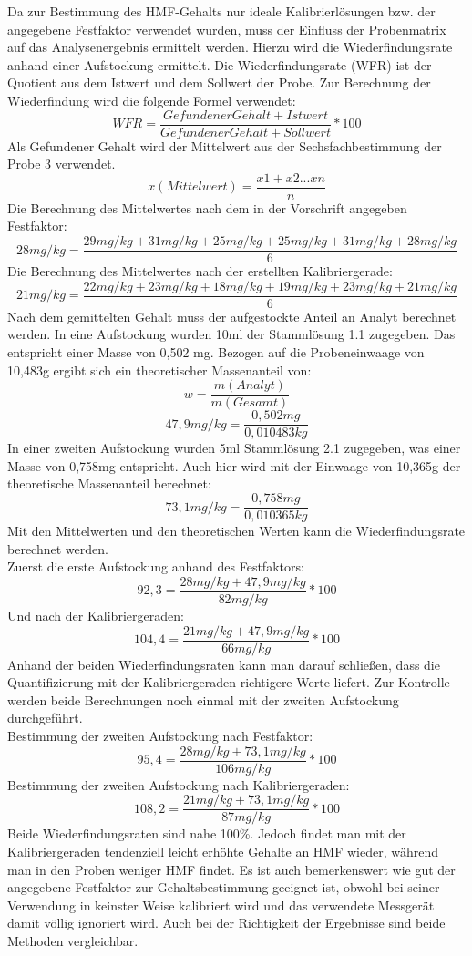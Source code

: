 Da zur Bestimmung des HMF-Gehalts nur ideale Kalibrierlösungen bzw. der angegebene Festfaktor verwendet wurden, muss der Einfluss der Probenmatrix auf das Analysenergebnis ermittelt werden. Hierzu wird die Wiederfindungsrate anhand einer Aufstockung ermittelt. Die Wiederfindungsrate (WFR) ist der Quotient aus dem Istwert und dem Sollwert der Probe. Zur Berechnung der Wiederfindung wird die folgende Formel verwendet:
    \[WFR=\frac{ Gefundener Gehalt + Istwert }{ Gefundener Gehalt + Sollwert } *100 \]
Als Gefundener Gehalt wird der Mittelwert aus der Sechsfachbestimmung der Probe 3 verwendet.
    \[x(Mittelwert)=\frac{ x1+x2...xn }{ n } \]
Die Berechnung des Mittelwertes nach dem in der Vorschrift angegeben Festfaktor:
    \[28mg/kg=\frac{ 29mg/kg+31mg/kg+25mg/kg+25mg/kg+31mg/kg+28mg/kg }{ 6 } \]
Die Berechnung des Mittelwertes nach der erstellten Kalibriergerade:
    \[21mg/kg=\frac{ 22mg/kg+23mg/kg+18mg/kg+19mg/kg+23mg/kg+21mg/kg }{ 6 } \]
Nach dem gemittelten Gehalt muss der aufgestockte Anteil an Analyt berechnet werden. In eine Aufstockung wurden 10ml der Stammlösung 1.1 zugegeben. Das entspricht einer Masse von 0,502 mg. Bezogen auf die Probeneinwaage von 10,483g ergibt sich ein theoretischer Massenanteil von:
    \[w=\frac{ m(Analyt) }{ m(Gesamt) } \]
    \[47,9mg/kg=\frac{ 0,502mg }{ 0,010483kg } \]
In einer zweiten Aufstockung wurden 5ml Stammlösung 2.1 zugegeben, was einer Masse von 0,758mg entspricht. Auch hier wird mit der Einwaage von 10,365g der theoretische Massenanteil berechnet:
    \[73,1mg/kg=\frac{ 0,758mg }{ 0,010365kg } \]
Mit den Mittelwerten und den theoretischen Werten kann die Wiederfindungsrate berechnet werden.\\
Zuerst die erste Aufstockung anhand des Festfaktors:
    \[92,3=\frac{ 28mg/kg + 47,9mg/kg }{ 82mg/kg } *100 \]
Und nach der Kalibriergeraden:
    \[104,4=\frac{ 21mg/kg + 47,9mg/kg }{ 66mg/kg } *100 \]
Anhand der beiden Wiederfindungsraten kann man darauf schließen, dass die Quantifizierung mit der Kalibriergeraden richtigere Werte liefert. Zur Kontrolle werden beide Berechnungen noch einmal mit der zweiten Aufstockung durchgeführt.\\
Bestimmung der zweiten Aufstockung nach Festfaktor:
    \[95,4=\frac{ 28mg/kg + 73,1mg/kg }{ 106mg/kg } *100 \]
Bestimmung der zweiten Aufstockung nach Kalibriergeraden:
    \[108,2=\frac{ 21mg/kg + 73,1mg/kg }{ 87mg/kg } *100 \]
Beide Wiederfindungsraten sind nahe 100\%. Jedoch findet man mit der Kalibriergeraden tendenziell leicht erhöhte Gehalte an HMF wieder, während man in den Proben weniger HMF findet. Es ist auch bemerkenswert wie gut der angegebene Festfaktor zur Gehaltsbestimmung geeignet ist, obwohl bei seiner Verwendung in keinster Weise kalibriert wird und das verwendete Messgerät damit völlig ignoriert wird. Auch bei der Richtigkeit der Ergebnisse sind beide Methoden vergleichbar.
